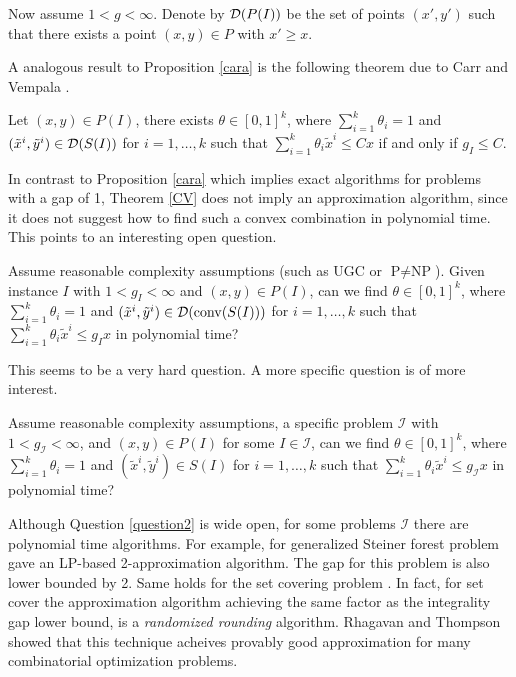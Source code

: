 \documentclass[runningheads]{llncs}
\begin{document}
Now assume $1<g<\infty$. Denote by $\operatorname{\mathcal{D}}(P(I))$ be the set of points $(x',y')$ such that there exists a point $(x,y)\in P$ with $x'\geq x$.

A analogous result to Proposition \ref{cara} is the following theorem due to Carr and Vempala \cite{CV}. 

\begin{theorem} \label{CV}
	Let $(x,y)\in P(I)$, there exists $\theta \in [0,1]^k$, where $\sum_{i=1}^{k}\theta_i =1$ and $(\tilde{x}^i,\tilde{y}^i)\in \operatorname{\mathcal{D}}(S(I))$ for $i=1,\ldots,k$ such that $\sum_{i=1}^{k}\theta_i \tilde{x}^i\leq Cx$ if and only if $g_I \leq C$.
\end{theorem}

In contrast to Proposition \ref{cara} which implies exact algorithms for problems with a gap of 1, Theorem \ref{CV} does not imply an approximation algorithm, since it does not suggest how to find such a convex combination in polynomial time. This points to an interesting open question. 

\begin{question}\label{question1}
	Assume reasonable complexity assumptions (such as UGC or $\textrm{P}\neq \textrm{NP}$). Given instance $I$ with $1<g_I<\infty$ and $(x,y)\in P(I)$, can we find $\theta \in [0,1]^k$, where $\sum_{i=1}^{k}\theta_i =1$ and $(\tilde{x}^i,\tilde{y}^i)\in \operatorname{\mathcal{D}}(\operatorname{conv}(S(I)))$ for $i=1,\ldots,k$ such that $\sum_{i=1}^{k}\theta_i \tilde{x}^i\leq g_Ix$ in polynomial time?
\end{question}

This seems to be a very hard question. A more specific question is of more interest.

\begin{question}\label{question2}
	Assume reasonable complexity assumptions, a specific problem $\mathcal{I}$ with  $1<g_{\mathcal{I}}<\infty$, and $(x,y)\in P(I)$ for some $I\in \mathcal{I}$, can we find $\theta \in [0,1]^k$, where $\sum_{i=1}^{k}\theta_i =1$ and $(\tilde{x}^i,\tilde{y}^i)\in S(I)$ for $i=1,\ldots,k$ such that $\sum_{i=1}^{k}\theta_i \tilde{x}^i\leq g_{\mathcal{I}}x$ in polynomial time?
\end{question}
Although Question \ref{question2} is wide open, for some problems $\mathcal{I}$ there are polynomial time algorithms. For example, for generalized Steiner forest problem \cite{jain} gave an LP-based 2-approximation algorithm. The gap for this problem is also lower bounded by 2. Same holds for the set covering problem \cite{randomizedrounding}. In fact, for set cover the approximation algorithm achieving the same factor as the integrality gap lower bound, is a \textit{randomized rounding} algorithm. Rhagavan and Thompson \cite{randomizedrounding} showed that this technique acheives provably good approximation for many combinatorial optimization problems.  
\end{document}

